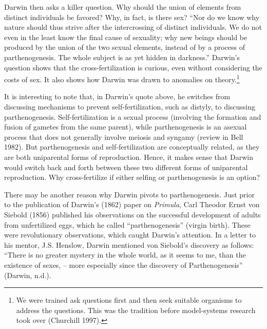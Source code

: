 \documentclass[
  letterpaper,
]{book}
\begin{document}
Darwin then asks a killer question. Why should the union of elements
from distinct individuals be favored? Why, in fact, is there sex? ``Nor
do we know why nature should thus strive after the intercrossing of
distinct individuals. We do not even in the least know the final cause
of sexuality; why new beings should be produced by the union of the two
sexual elements, instead of by a process of parthenogenesis. The whole
subject is as yet hidden in darkness.'' Darwin's question shows that the
cross-fertilization is curious, even without considering the costs of
sex. It also shows how Darwin was drawn to anomalies on
theory.\footnote{We were trained ask questions first and then seek
  suitable organisms to address the questions. This was the tradition
  before model-systems research took over (Churchill 1997).}

It is interesting to note that, in Darwin's quote above, he switches
from discussing mechanisms to prevent self-fertilization, such as
distyly, to discussing parthenogenesis. Self-fertilization is a sexual
process (involving the formation and fusion of gametes from the same
parent), while parthenogenesis is an asexual process that does not
generally involve meiosis and syngamy (review in Bell 1982). But
parthenogenesis and self-fertilization are conceptually related, as they
are both uniparental forms of reproduction. Hence, it makes sense that
Darwin would switch back and forth between these two different forms of
uniparental reproduction. Why cross-fertilize if either selfing or
parthenogenesis is an option?

There may be another reason why Darwin pivots to parthenogenesis. Just
prior to the publication of Darwin's (1862) paper on \emph{Primula},
Carl Theodor Ernst von Siebold (1856) published his observations on the
successful development of adults from unfertilized eggs, which he called
``parthenogenesis'' (virgin birth). These were revolutionary
observations, which caught Darwin's attention. In a letter to his
mentor, J.S. Henslow, Darwin mentioned von Siebold's discovery as
follows: ``There is no greater mystery in the whole world, as it seems
to me, than the existence of sexes, -- more especially since the
discovery of Parthenogenesis'' (Darwin, n.d.).
\end{document}
